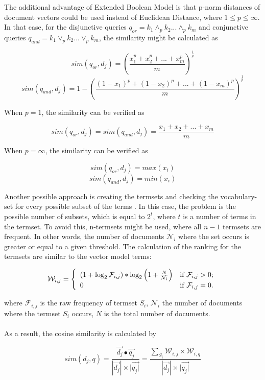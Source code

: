 \documentclass[paper=8.27in:11.69in, 12pt]{scrartcl}
\begin{document}
The additional advantage of Extended Boolean Model is that p-norm distances of document vectors could be used instead of Euclidean Distance, where \(1 \leq p \leq \infty\). In that case, for the disjunctive queries \(q_{or} = k_{1} \wedge_{p} k_{2} ... \wedge_{p} k_{m}\) and conjunctive queries \(q_{and} = k_{1} \vee_{p} k_{2} ... \vee_{p} k_{m}\), the similarity might be calculated as 

\[ sim(q_{or}, d_{j}) = \left ( \frac{x_{1}^{p} + x_{2}^{p} + ... + x_{m}^{p} }{m} \right )^{\frac{1}{p}} \]
\[ sim(q_{and}, d_{j}) = 1 - \left (\frac{(1 - x_{1})^{p} + (1 - x_{2})^{p} + ... + (1 - x_{m})^{p}}{m}\right )^{\frac{1}{p}} \]

When \(p = 1\), the similarity can be verified as

\[ sim(q_{or}, d_{j}) = sim(q_{and}, d_{j}) = \frac{x_{1} + x_{2} + ... + x_{m}}{m}\]

When \(p = \infty \), the similarity can be verified as

\[ sim(q_{or}, d_{j}) = max(x_{i}) \]
\[ sim(q_{and}, d_{j}) = min(x_{i}) \]

Another possible approach is creating the termsets and checking the vocabulary-set for every possible subset of the terms \cite{possas2005set}. In this case, the problem is the possible number of subsets, which is equal to \(2^{t}\), where \(t\) is a number of terms in the termset. To avoid this, n-termsets might be used, where all \(n-1\) termsets are frequent. In other words, the number of documents \(\mathcal{N}_{i}\) where the set occurs is greater or equal to a given threshold. The calculation of the ranking for the termsets are similar to the vector model terms:

\[ \mathcal{W}_{i, j} = \left\{ \begin{array}{ll}
(1 + \log_{2} \mathcal{F}_{i, j})  * \log_{2} \left ( 1 + \frac{N}{\mathcal{N}_{i}} \right ) & \mbox{if $\mathcal{F}_{i, j} > 0$};\\
$0$ & \mbox{if $\mathcal{F}_{i, j} = 0$}.\end{array} \right. \]

where \(\mathcal{F}_{i, j}\) is the raw frequency of termset \(S_{i}\), \(\mathcal{N}_{i}\) the number of documents where the termset \(S_{i}\) occurs, \(N\) is the total number of documents.\\
\\
As a result, the cosine similarity is calculated by 

\[sim(d_{j},q) = \frac{\vec{d_{j}} \bullet \vec{q_{j}}}{|\vec{d_{j}}| \times |\vec{q_{j}|}} = \frac{\sum_{S_{i}} \mathcal{W}_{i,j} \times \mathcal{W}_{i,q}}{|\vec{d_{j}}| \times |\vec{q_{j}|}}\]
\end{document}
